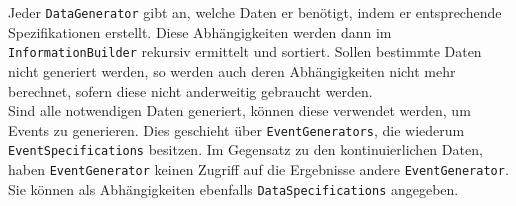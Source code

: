 \documentclass[11pt,a4paper]{article}
\begin{document}
Jeder \lstinline!DataGenerator! gibt an, welche Daten er benötigt, indem er entsprechende Spezifikationen erstellt. Diese Abhängigkeiten werden dann im \lstinline!InformationBuilder! rekursiv ermittelt und sortiert. Sollen bestimmte Daten nicht generiert werden, so werden auch deren Abhängigkeiten nicht mehr berechnet, sofern diese nicht anderweitig gebraucht werden.\\
Sind alle notwendigen Daten generiert, können diese verwendet werden, um Events zu generieren. Dies geschieht über \lstinline!EventGenerators!, die wiederum \lstinline!EventSpecifications! besitzen. Im Gegensatz zu den kontinuierlichen Daten, haben \lstinline!EventGenerator! keinen Zugriff auf die Ergebnisse andere \lstinline!EventGenerator!. Sie können als Abhängigkeiten ebenfalls \lstinline!DataSpecifications! angegeben.




\end{document}
